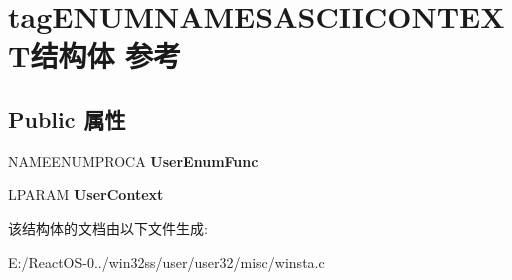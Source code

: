 \hypertarget{structtag_e_n_u_m_n_a_m_e_s_a_s_c_i_i_c_o_n_t_e_x_t}{}\section{tag\+E\+N\+U\+M\+N\+A\+M\+E\+S\+A\+S\+C\+I\+I\+C\+O\+N\+T\+E\+X\+T结构体 参考}
\label{structtag_e_n_u_m_n_a_m_e_s_a_s_c_i_i_c_o_n_t_e_x_t}
\subsection*{Public 属性}
\begin{DoxyCompactItemize}
\item 
\mbox{\label{structtag_e_n_u_m_n_a_m_e_s_a_s_c_i_i_c_o_n_t_e_x_t_aab94aaaad5781f85c4efb69d5443b488}} 
N\+A\+M\+E\+E\+N\+U\+M\+P\+R\+O\+CA {\bfseries User\+Enum\+Func}
\item 
\mbox{\label{structtag_e_n_u_m_n_a_m_e_s_a_s_c_i_i_c_o_n_t_e_x_t_a6da1a1423d0a50d4de92e44adb858cc1}} 
L\+P\+A\+R\+AM {\bfseries User\+Context}
\end{DoxyCompactItemize}


该结构体的文档由以下文件生成\+:\begin{DoxyCompactItemize}
\item 
E\+:/\+React\+O\+S-\/0../win32ss/user/user32/misc/winsta.\+c\end{DoxyCompactItemize}

